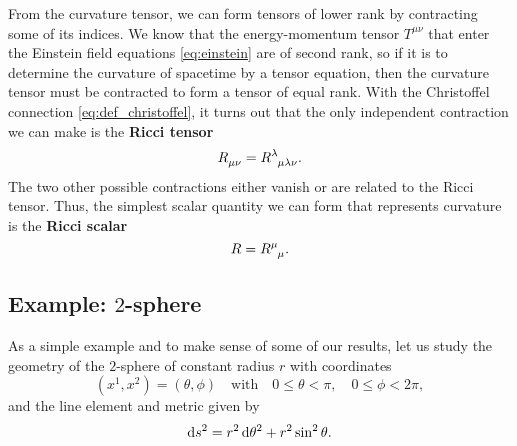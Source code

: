 
From the curvature tensor, we can form tensors of lower rank by contracting some of its indices.
We know that the energy-momentum tensor $T^{\mu \nu}$ that enter the Einstein field equations \eqref{eq:einstein} are of second rank, so if it is to determine the curvature of spacetime by a tensor equation, then the curvature tensor must be contracted to form a tensor of equal rank.
With the Christoffel connection \cref{eq:def_christoffel}, it turns out that the only independent contraction we can make is the \textbf{Ricci tensor}
\begin{equation}
	R\indices{_\mu_\nu} = R\indices{^\lambda_\mu_\lambda_\nu} .
	\label{eq:def_ricci_tensor}
\end{equation}
The two other possible contractions either vanish or are related to the Ricci tensor.
Thus, the simplest scalar quantity we can form that represents curvature is the \textbf{Ricci scalar}
\begin{equation}
	R = R\indices{^\mu_\mu} .
	\label{eq:def_ricci_scalar}
\end{equation}

\subsection{Example: \texorpdfstring{$2$}{2}-sphere}


As a simple example and to make sense of some of our results, let us study the geometry of the $2$-sphere of constant radius $r$ with coordinates
\begin{equation}
	(x^1, x^2) = (\theta, \phi)
	\quad \text{with} \quad
	0 \leq \theta < \pi , \quad
	0 \leq \phi < 2 \pi ,
\end{equation}
and the line element and metric given by
\begin{equation}
	\mathop{}\!\mathrm{d} s^2 = r^2 \mathop{}\!\mathrm{d} \theta^2 + r^2 \sin^2 \theta .
\end{equation}

